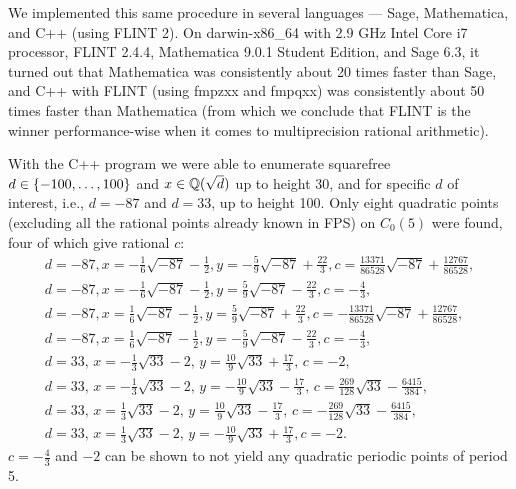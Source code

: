 We implemented this same procedure in several languages --- Sage,
Mathematica, and C++ (using FLINT 2). On darwin-x86\_64 with 2.9 GHz
Intel Core i7 processor, FLINT 2.4.4, Mathematica 9.0.1 Student
Edition, and Sage 6.3, it turned out that Mathematica was consistently
about 20 times faster than Sage, and C++ with FLINT (using fmpzxx and
fmpqxx) was consistently about 50 times faster than Mathematica (from
which we conclude that FLINT is the winner performance-wise when it
comes to multiprecision rational arithmetic).

With the C++ program we were able to enumerate squarefree $d \in
\left\{-100, \dots, 100\right\}$ and $x \in \mathbb{Q}(\sqrt{d})$ up to height 30, and
for specific $d$ of interest, i.e., $d = -87$ and $d = 33$,
up to height 100. Only eight quadratic points (excluding all the
rational points already known in FPS) on $C_0(5)$ were found, four of
which give rational $c$:
\[
\begin{gathered}
  d = -87,
  x = -\frac{1}{6} \sqrt{-87} - \frac{1}{2},
  y = -\frac{5}{9} \sqrt{-87} + \frac{22}{3},
  c = \frac{13371}{86528} \sqrt{-87} + \frac{12767}{86528},
  \\
  d = -87,
  x = -\frac{1}{6} \sqrt{-87} - \frac{1}{2},
  y = \frac{5}{9} \sqrt{-87} - \frac{22}{3},
  c = -\frac{4}{3},
  \\
  d = -87,
  x = \frac{1}{6} \sqrt{-87} - \frac{1}{2},
  y = \frac{5}{9} \sqrt{-87} + \frac{22}{3},
  c = -\frac{13371}{86528} \sqrt{-87} + \frac{12767}{86528},
  \\
  d = -87,
  x = \frac{1}{6} \sqrt{-87} - \frac{1}{2},
  y = -\frac{5}{9} \sqrt{-87} - \frac{22}{3},
  c = -\frac{4}{3},
  \\
  d = 33,\,
  x = -\frac{1}{3} \sqrt{33} - 2,\,
  y = \frac{10}{9} \sqrt{33} + \frac{17}{3},\,
  c = -2,
  \\
  d = 33,\,
  x = -\frac{1}{3} \sqrt{33} - 2,\,
  y = -\frac{10}{9} \sqrt{33} - \frac{17}{3},\,
  c = \frac{269}{128} \sqrt{33} - \frac{6415}{384},
  \\
  d = 33,\,
  x = \frac{1}{3} \sqrt{33} - 2,\,
  y = \frac{10}{9} \sqrt{33} - \frac{17}{3},\,
  c = -\frac{269}{128} \sqrt{33} - \frac{6415}{384},
  \\
  d = 33,\,
  x = \frac{1}{3} \sqrt{33} - 2,\,
  y = -\frac{10}{9} \sqrt{33} + \frac{17}{3},
  c = -2.
\end{gathered}
\]
$c = -\frac{4}{3}$ and $-2$ can be shown to not yield any quadratic
periodic points of period 5.

